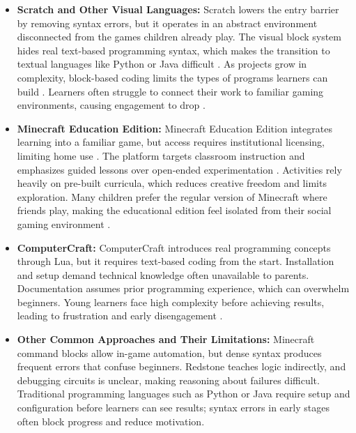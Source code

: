 \begin{itemize}
    \item[\textbf{--}] \textbf{Scratch and Other Visual Languages:}
    Scratch lowers the entry barrier by removing syntax errors, but it operates in an abstract environment disconnected from the games children already play. 
    The visual block system hides real text-based programming syntax, which makes the transition to textual languages like Python or Java difficult \cite{noauthor_connecting_2024}. 
    As projects grow in complexity, block-based coding limits the types of programs learners can build \cite{guide_scratch_2023}. 
    Learners often struggle to connect their work to familiar gaming environments, causing engagement to drop \cite{adler_improving_nodate}.

    \item[\textbf{--}] \textbf{Minecraft Education Edition:}
    Minecraft Education Edition integrates learning into a familiar game, but access requires institutional licensing, limiting home use \cite{noauthor_licensing_nodate}. 
    The platform targets classroom instruction and emphasizes guided lessons over open-ended experimentation \cite{noauthor_pros_2025}. 
    Activities rely heavily on pre-built curricula, which reduces creative freedom and limits exploration. 
    Many children prefer the regular version of Minecraft where friends play, making the educational edition feel isolated from their social gaming environment \cite{sripan_gamified_2025}.

    \item[\textbf{--}] \textbf{ComputerCraft:}
    ComputerCraft introduces real programming concepts through Lua, but it requires text-based coding from the start. 
    Installation and setup demand technical knowledge often unavailable to parents. 
    Documentation assumes prior programming experience, which can overwhelm beginners. 
    Young learners face high complexity before achieving results, leading to frustration and early disengagement \cite{kazemitabaar_scaffolding_2023}.

    \item[\textbf{--}] \textbf{Other Common Approaches and Their Limitations:}
    Minecraft command blocks allow in-game automation, but dense syntax produces frequent errors that confuse beginners. 
    Redstone teaches logic indirectly, and debugging circuits is unclear, making reasoning about failures difficult. 
    Traditional programming languages such as Python or Java require setup and configuration before learners can see results; syntax errors in early stages often block progress and reduce motivation.
\end{itemize}

